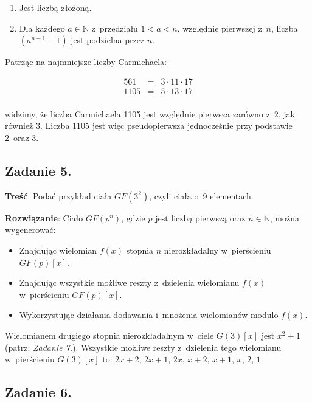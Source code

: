 \documentclass[a4paper,10pt, twocolumn]{article}
\begin{document}
\begin{enumerate}
 \item Jest liczbą złożoną.
 \item Dla każdego $a \in \mathbb{N}$ z~przedziału $1 < a < n$, względnie pierwszej z~$n$, liczba $(a^{n-1} - 1)$ jest podzielna przez $n$.
\end{enumerate}

Patrząc na najmniejsze liczby Carmichaela:

\begin{equation*}
 \begin{array}{lcl} 561& = & 3 \cdot 11 \cdot 17 \\ 1105 & = & 5 \cdot 13 \cdot 17 \\ \end{array}
\end{equation*}

\noindent widzimy, że liczba Carmichaela 1105 jest względnie pierwsza zarówno z~2, jak również 3. Liczba 1105 jest więc pseudopierwsza jednocześnie przy podstawie 2~oraz 3.

\subsection{Zadanie 5.}

\textbf{Treść}: Podać przykład ciała $GF(3^{2})$, czyli ciała o~9 elementach.

\textbf{Rozwiązanie}: Ciało $GF(p^{n})$, gdzie $p$ jest liczbą pierwszą oraz $n \in \mathbb{N}$, można wygenerować:

\begin{itemize}
 \item Znajdując wielomian $f(x)$ stopnia $n$ nierozkładalny w~pierścieniu $GF(p)[x]$.
 \item Znajdując wszystkie możliwe reszty z~dzielenia wielomianu $f(x)$ w~pierścieniu $GF(p)[x]$.
 \item Wykorzystując działania dodawania i~mnożenia wielomianów modulo $f(x)$.
\end{itemize}

Wielomianem drugiego stopnia nierozkładalnym w~ciele $G(3)[x]$ jest $x^2 + 1$ (patrz: \emph{Zadanie 7.}). Wszystkie możliwe reszty z~dzielenia tego wielomianu w~pierścieniu $G(3)[x]$ to: $2x + 2$, $2x + 1$, $2x$, $x + 2$, $x + 1$, $x$, $2$, $1$.

\subsection{Zadanie 6.}
\end{document}
